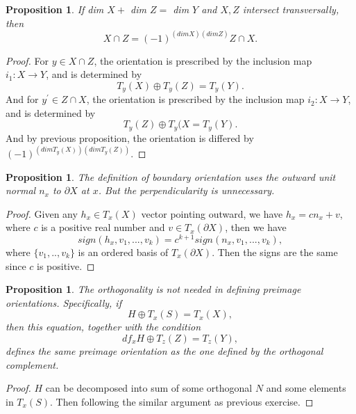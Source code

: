 \documentclass[psamsfonts]{amsart}
\newtheorem{prop}[theorem]{Proposition}
\theoremstyle{definition}
\theoremstyle{remark}
\numberwithin{equation}{section}
\begin{document}
	\begin{prop}
		If dim $X+$ dim $Z = $ dim $Y$ and $X,Z$ intersect transversally, then
		\begin{equation}
			X \cap Z = (-1)^{(dim X)(dim Z)} Z \cap X.	
		\end{equation}		 
	\end{prop}
	\begin{proof}
		For $y \in X \cap Z$, the orientation is prescribed by the inclusion map $i_1: X \to Y$, and is determined by 
		\begin{equation}
			T_y(X) \oplus T_y(Z) = T_y(Y).
		\end{equation}
		And for $y^\prime \in Z \cap X$, the orientation is prescribed by the inclusion map $i_2: X \to Y$, and is determined by 
		\begin{equation}
			T_y(Z) \oplus T_y(X = T_y(Y).
		\end{equation}
		And by previous proposition, the orientation is differed by $(-1)^{(dim T_y(X))(dim T_y(Z))}$.
	\end{proof}
	\begin{prop}
		The definition of boundary orientation uses the outward unit normal $n_x$ to $\partial X$ at $x$. But the perpendicularity is unnecessary.
	\end{prop}
	\begin{proof}
		Given any $h_x \in T_x(X)$ vector pointing outward, we have $h_x = cn_x + v$, where $c$ is a positive real number and $v \in T_x(\partial X)$, then we have 
		\begin{equation}
			sign(h_x,v_1,...,v_k) = c^{k+1}sign(n_x,v_1,...,v_k),
		\end{equation}
		where $\{ v_1,..,v_k \}$ is an ordered basis of $T_x(\partial X)$. Then the signs are the same since $c$ is positive.
	\end{proof}
	\begin{prop}
		The orthogonality is not needed in defining preimage orientations. Specifically, if
		\begin{equation}
			H \oplus T_x(S) = T_x(X),
		\end{equation}
		then this equation, together with the condition
		\begin{equation}
			df_xH \oplus T_z(Z) = T_z(Y), 
		\end{equation}
		defines the same preimage orientation as the one defined by the orthogonal complement.
	\end{prop}
	\begin{proof}
		$H$ can be decomposed into sum of some orthogonal $N$ and some elements in $T_x(S)$. Then following the similar argument as previous exercise.
	\end{proof}
\end{document}
